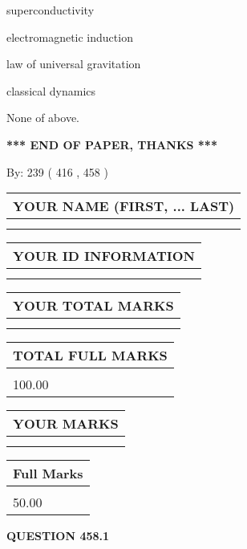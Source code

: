\documentclass[12pt]{article}
\begin{document}
 
superconductivity
 
 
electromagnetic induction
 
 
law of universal gravitation
 
 
classical dynamics
 
 
 None of above.
 
 
   
   
\vspace{1.0in} 
{\textbf{\large{ *** END OF PAPER, THANKS *** }}} 
   
   
\hspace{1.0in} By: 
 239 ( 416 ,  458 )
   
   
   
   
\newpage 
\setcounter{page}{ 
   458001 } 
   
   
   
   
\noindent\begin{tabular}{|l|}
\hline
YOUR NAME (FIRST, ... LAST)  \\
\hline
 \\ 
 \\ 
\hline
\end{tabular}
\hspace{0.05in} \begin{tabular}{|l|}
\hline
 YOUR   ID   INFORMATION  \\
\hline
 \\ 
 \\ 
\hline
\end{tabular}
   
   
\vspace{0.2in}\noindent\begin{tabular}{|l|}
\hline
YOUR TOTAL MARKS  \\
\hline
 \\ 
 \\ 
\hline
\end{tabular}
\hspace{0.05in} \begin{tabular}{|l|}
\hline
TOTAL FULL MARKS  \\
\hline
 \\ 
100.00 \\
\hline
\end{tabular}
  
\vspace{0.2in}
  
\noindent\begin{tabular}{|l|}
\hline
 YOUR MARKS  \\
\hline
 \\ 
 \\ 
\hline
\end{tabular}
\hspace{0.05in} \begin{tabular}{|l|}
\hline
 Full Marks  \\
\hline
 \\ 
50.00 \\
\hline
\end{tabular}
{\textbf{\Large{QUESTION
458.1 
}}}
  
\end{document}
